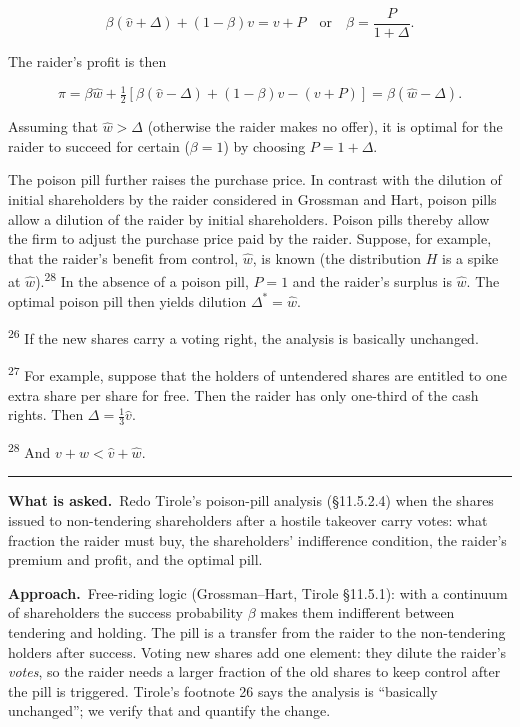 \documentclass[11pt,a4paper]{article}
\newcommand{\asked}{\par\medskip\noindent\textbf{What is asked.}~}
\newcommand{\approach}{\par\smallskip\noindent\textbf{Approach.}~}
\newcommand{\stmtend}{\par\endgroup\nopagebreak\noindent\rule{\linewidth}{0.4pt}\par\medskip}
\begin{document}
\[\beta(\hat v + \Delta) + (1 - \beta)v = v + P \quad\text{or}\quad \beta = \frac{P}{1 + \Delta}.\]

The raider's profit is then

\[\pi = \beta\hat w + \tfrac{1}{2}[\beta(\hat v - \Delta) + (1 - \beta)v - (v + P)] = \beta(\hat w - \Delta).\]

Assuming that \(\hat w > \Delta\) (otherwise the raider makes no offer), it is optimal for the
raider to succeed for certain (\(\beta = 1\)) by choosing \(P = 1 + \Delta\).

The poison pill further raises the purchase price. In contrast with the dilution of initial
shareholders by the raider considered in Grossman and Hart, poison pills allow a dilution of the
raider by initial shareholders. Poison pills thereby allow the firm to adjust the purchase price
paid by the raider. Suppose, for example, that the raider's benefit from control, \(\hat w\), is
known (the distribution \(H\) is a spike at \(\hat w\)).\textsuperscript{28} In the absence of a
poison pill, \(P = 1\) and the raider's surplus is \(\hat w\). The optimal poison pill then yields
dilution \(\Delta^* = \hat w\).

\textsuperscript{26} If the new shares carry a voting right, the analysis is basically unchanged.

\textsuperscript{27} For example, suppose that the holders of untendered shares are entitled to one
extra share per share for free. Then the raider has only one-third of the cash rights. Then
\(\Delta = \frac{1}{3}\hat v\).

\textsuperscript{28} And \(v + w < \hat v + \hat w\).
\stmtend

\asked Redo Tirole's poison-pill analysis (\S11.5.2.4) when the shares issued to non-tendering
shareholders after a hostile takeover carry votes: what fraction the raider must buy, the
shareholders' indifference condition, the raider's premium and profit, and the optimal pill.

\approach Free-riding logic (Grossman--Hart, Tirole \S11.5.1): with a continuum of shareholders the
success probability $\beta$ makes them indifferent between tendering and holding. The pill is a
transfer from the raider to the non-tendering holders after success. Voting new shares add one
element: they dilute the raider's \emph{votes}, so the raider needs a larger fraction of the old shares
to keep control after the pill is triggered. Tirole's footnote 26 says the analysis is ``basically
unchanged''; we verify that and quantify the change.
\end{document}
